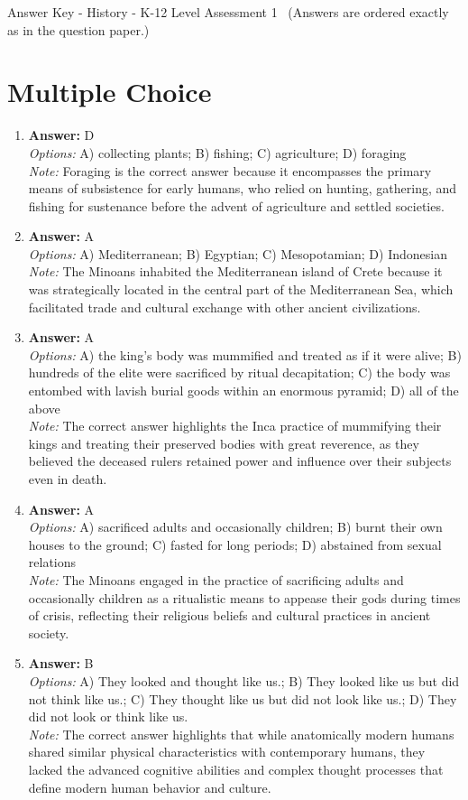\documentclass[12pt]{article}
\begin{document}
\begin{center}
Answer Key - History - K-12 Level Assessment 1 \
\small (Answers are ordered exactly as in the question paper.)
\end{center}

\section*{Multiple Choice}
\begin{enumerate}[label=\arabic*.]
\item \textbf{Answer:} D
\\ \textit{Options:} A) collecting plants; B) fishing; C) agriculture; D) foraging
\\ \textit{Note:} Foraging is the correct answer because it encompasses the primary means of subsistence for early humans, who relied on hunting, gathering, and fishing for sustenance before the advent of agriculture and settled societies.
\item \textbf{Answer:} A
\\ \textit{Options:} A) Mediterranean; B) Egyptian; C) Mesopotamian; D) Indonesian
\\ \textit{Note:} The Minoans inhabited the Mediterranean island of Crete because it was strategically located in the central part of the Mediterranean Sea, which facilitated trade and cultural exchange with other ancient civilizations.
\item \textbf{Answer:} A
\\ \textit{Options:} A) the king's body was mummified and treated as if it were alive; B) hundreds of the elite were sacrificed by ritual decapitation; C) the body was entombed with lavish burial goods within an enormous pyramid; D) all of the above
\\ \textit{Note:} The correct answer highlights the Inca practice of mummifying their kings and treating their preserved bodies with great reverence, as they believed the deceased rulers retained power and influence over their subjects even in death.
\item \textbf{Answer:} A
\\ \textit{Options:} A) sacrificed adults and occasionally children; B) burnt their own houses to the ground; C) fasted for long periods; D) abstained from sexual relations
\\ \textit{Note:} The Minoans engaged in the practice of sacrificing adults and occasionally children as a ritualistic means to appease their gods during times of crisis, reflecting their religious beliefs and cultural practices in ancient society.
\item \textbf{Answer:} B
\\ \textit{Options:} A) They looked and thought like us.; B) They looked like us but did not think like us.; C) They thought like us but did not look like us.; D) They did not look or think like us.
\\ \textit{Note:} The correct answer highlights that while anatomically modern humans shared similar physical characteristics with contemporary humans, they lacked the advanced cognitive abilities and complex thought processes that define modern human behavior and culture.
\end{enumerate}
\end{document}
